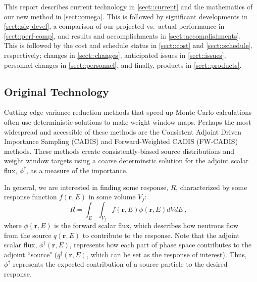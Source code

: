\documentclass[12pt]{article}
\newcommand{\ve}[1]{\ensuremath{\mathbf{#1}}}
\begin{document}
This report describes current technology in \autoref{sect::current} and the mathematics of our new method in \autoref{sect::omega}. This is followed by significant developments in \autoref{sect::sig-devel}, a comparison of our projected vs.\ actual performance in \autoref{sect::perf-comp}, and results and accomplishments in \autoref{sect::accomplishments}. This is followed by the cost and schedule status in \autoref{sect::cost} and \autoref{sect::schedule}, respectively; changes in \autoref{sect::changes}, anticipated issues in \autoref{sect::issues}, personnel changes in \autoref{sect::personnel}, and finally, products in \autoref{sect::products}.  

\subsection{Original Technology}
\label{sect::current}
Cutting-edge variance reduction methods that speed up Monte Carlo calculations often use deterministic solutions to make weight window maps. 
Perhaps the most widespread and accessible of these methods are the Consistent Adjoint Driven Importance Sampling (CADIS) \cite{wagner_automatic_1997,wagner_automated_1998,haghighat_monte_2003} and Forward-Weighted CADIS (FW-CADIS) \cite{wagner_forward-weighted_2007,wagner_forward-weighted_2009,wagner_forward-weighted_2010} methods. 
These methods create consistently-biased source distributions and weight window targets using a coarse determinstic solution for the adjoint scalar flux, $\phi^{\dagger}$, as a measure of the importance. 

In general, we are interested in finding some response, $R$, characterized by some response function $f(\ve{r}, E)$ in some volume $V_f$:
%
\begin{equation}
 R = \int_E \int_{V_f} f(\ve{r}, E) \phi(\ve{r}, E) dV dE \:,
 \label{eq:Response}
\end{equation}
where $\phi(\ve{r}, E)$ is the forward scalar flux, which describes how neutrons flow from the source $q(\ve{r}, E)$ to contribute to the response. 
Note that the adjoint scalar flux, $\phi^{\dagger}(\ve{r}, E)$, represents how each part of phase space contributes to the adjoint ``source" ($q^{\dagger}(\ve{r}, E)$, which can be set as the response of interest). 
Thus, $\phi^{\dagger}$ represents the expected contribution of a source particle to the desired response.
 
\end{document}
